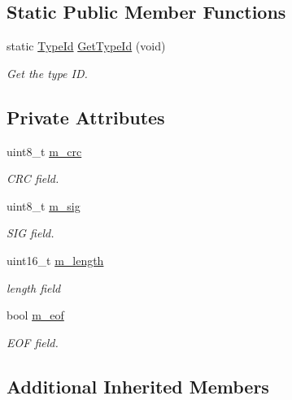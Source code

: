 \subsection*{Static Public Member Functions}
\begin{DoxyCompactItemize}
\item 
static \hyperlink{classns3_1_1TypeId}{Type\+Id} \hyperlink{classns3_1_1AmpduSubframeHeader_ac71be8f0d0b717078970626aebfb4075}{Get\+Type\+Id} (void)
\begin{DoxyCompactList}\small\item\em Get the type ID. \end{DoxyCompactList}\end{DoxyCompactItemize}
\subsection*{Private Attributes}
\begin{DoxyCompactItemize}
\item 
uint8\+\_\+t \hyperlink{classns3_1_1AmpduSubframeHeader_a712176a4f5f5c78050d753ea0532a3c5}{m\+\_\+crc}
\begin{DoxyCompactList}\small\item\em C\+RC field. \end{DoxyCompactList}\item 
uint8\+\_\+t \hyperlink{classns3_1_1AmpduSubframeHeader_acec22aad5424bff633f1dc7da9661d7b}{m\+\_\+sig}
\begin{DoxyCompactList}\small\item\em S\+IG field. \end{DoxyCompactList}\item 
uint16\+\_\+t \hyperlink{classns3_1_1AmpduSubframeHeader_a0d4b7c0bd30ccbb940cfa58361474776}{m\+\_\+length}
\begin{DoxyCompactList}\small\item\em length field \end{DoxyCompactList}\item 
bool \hyperlink{classns3_1_1AmpduSubframeHeader_a6f1a3cb3b7f5f703862c4a1f4b7250c0}{m\+\_\+eof}
\begin{DoxyCompactList}\small\item\em E\+OF field. \end{DoxyCompactList}\end{DoxyCompactItemize}
\subsection*{Additional Inherited Members}


